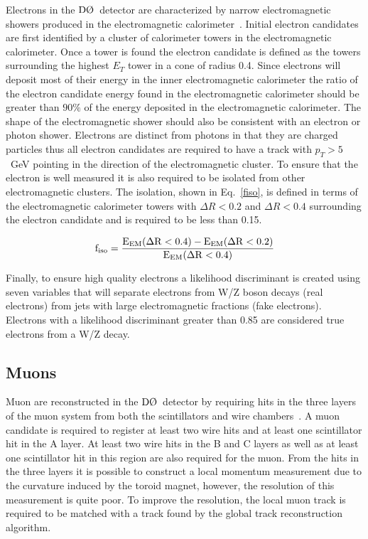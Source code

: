 Electrons in the $\dzero$~detector are characterized by narrow electromagnetic showers produced in the electromagnetic calorimeter~\cite{electron}. Initial electron candidates are first identified by a cluster of calorimeter towers in the electromagnetic calorimeter. Once a tower is found the electron candidate is defined as the towers surrounding the highest $E_{T}$ tower in a cone of radius 0.4. Since electrons will deposit most of their energy in the inner electromagnetic calorimeter the ratio of the electron candidate energy found in the electromagnetic calorimeter should be greater than $90\%$ of the energy deposited in the electromagnetic calorimeter. The shape of the electromagnetic shower should also be consistent with an electron or photon shower. Electrons are distinct from photons in that they are charged particles thus all electron candidates are required to have a track with $p_{T}>5$~GeV pointing in the direction of the electromagnetic cluster. 
To ensure that the electron is well measured it is also required to be isolated from other electromagnetic clusters. The isolation, shown in Eq.~\ref{fiso}, is defined in terms of the electromagnetic calorimeter towers with $\Delta R<0.2$ and $\Delta R<0.4$ surrounding the electron candidate and is required to be less than 0.15.

\begin{equation}
\label{fiso}
\rm{f_{iso}} = \frac{E_{EM}(\Delta R <  0.4) - E_{EM}(\Delta R <  0.2)}{E_{EM}(\Delta R <  0.4)}
\end{equation}

Finally, to ensure high quality electrons a likelihood discriminant is created using seven variables that will separate electrons from W/Z boson decays (real electrons) from jets with large electromagnetic fractions (fake electrons). Electrons with a likelihood discriminant greater than 0.85 are considered true electrons from a W/Z decay.

\subsection{Muons}
\label{muonreco}

Muon are reconstructed in the $\dzero$~detector by requiring hits in the three layers of the muon system from both the scintillators and wire chambers~\cite{muon}. A muon candidate is required to register at least two wire hits and at least one scintillator hit in the A layer.  At least two wire hits in the B and C layers as well as at least one scintillator hit in this region are also required for the muon. From the hits in the three layers it is possible to construct a local momentum measurement due to the curvature induced by the toroid magnet, however, the resolution of this measurement is quite poor. To improve the resolution, the local muon track is required to be matched with a track found by the global track reconstruction algorithm.


